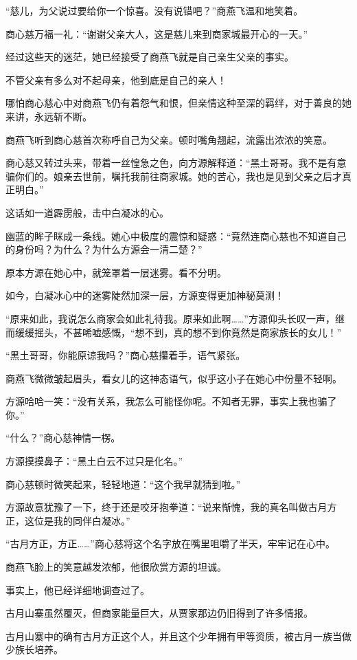\begin{this_body}
“慈儿，为父说过要给你一个惊喜。没有说错吧？”商燕飞温和地笑着。

商心慈万福一礼：“谢谢父亲大人，这是慈儿来到商家城最开心的一天。”

经过这些天的迷茫，她已经接受了商燕飞就是自己亲生父亲的事实。

不管父亲有多么对不起母亲，他到底是自己的亲人！

哪怕商心慈心中对商燕飞仍有着怨气和恨，但亲情这种至深的羁绊，对于善良的她来讲，永远斩不断。

商燕飞听到商心慈首次称呼自己为父亲。顿时嘴角翘起，流露出浓浓的笑意。

商心慈又转过头来，带着一丝惶急之色，向方源解释道：“黑土哥哥。我不是有意骗你们的。娘亲去世前，嘱托我前往商家城。她的苦心，我也是见到父亲之后才真正明白。”

这话如一道霹雳般，击中白凝冰的心。

幽蓝的眸子眯成一条线。她心中极度的震惊和疑惑：“竟然连商心慈也不知道自己的身份吗？为什么？为什么方源会一清二楚？”

原本方源在她心中，就笼罩着一层迷雾。看不分明。

如今，白凝冰心中的迷雾陡然加深一层，方源变得更加神秘莫测！

“原来如此，我说怎么商家会如此礼待我。原来如此啊……”方源仰头长叹一声，继而缓缓摇头，不甚唏嘘感慨，“想不到，真的想不到你竟然是商家族长的女儿！”

“黑土哥哥，你能原谅我吗？”商心慈攥着手，语气紧张。

商燕飞微微皱起眉头，看女儿的这神态语气，似乎这小子在她心中份量不轻啊。

方源哈哈一笑：“没有关系，我怎么可能怪你呢。不知者无罪，事实上我也骗了你。”

“什么？”商心慈神情一楞。

方源摸摸鼻子：“黑土白云不过只是化名。”

商心慈顿时微笑起来，轻轻地道：“这个我早就猜到啦。”

方源故意犹豫了一下，终于还是咬牙抱拳道：“说来惭愧，我的真名叫做古月方正，这位是我的同伴白凝冰。”

“古月方正，方正……”商心慈将这个名字放在嘴里咀嚼了半天，牢牢记在心中。

商燕飞脸上的笑意越发浓郁，他很欣赏方源的坦诚。

事实上，他已经详细地调查过了。

古月山寨虽然覆灭，但商家能量巨大，从贾家那边仍旧得到了许多情报。

古月山寨中的确有古月方正这个人，并且这个少年拥有甲等资质，被古月一族当做少族长培养。


\end{this_body}
